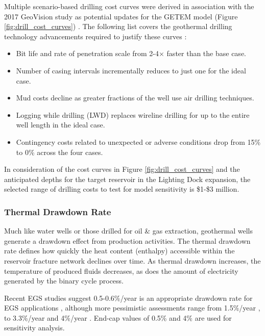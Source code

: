 Multiple scenario-based drilling cost curves were derived in association with the 2017 GeoVision study as potential updates for the GETEM model (Figure \ref{fig:drill_cost_curves}) \citep{lowry_implications_2017}. The following list covers the geothermal drilling technology advancements required to justify these curves \citep{augustine_geovision_2019}:
\begin{itemize}[itemsep=2pt]
    \item Bit life and rate of penetration scale from 2-4$\times$ faster than the base case.
    \item Number of casing intervals incrementally reduces to just one for the ideal case.
    \item Mud costs decline as greater fractions of the well use air drilling techniques.
    \item Logging while drilling (LWD) replaces wireline drilling for up to the entire well length in the ideal case.
    \item Contingency costs related to unexpected or adverse conditions drop from 15\% to 0\% across the four cases.
\end{itemize}
In consideration of the cost curves in Figure \ref{fig:drill_cost_curves} and the anticipated depths for the target reservoir in the Lighting Dock expansion, the selected range of drilling costs to test for model sensitivity is \$1-\$3 million.

\subsubsection{Thermal Drawdown Rate}\label{ch4:drawdown_uncertainty}
Much like water wells or those drilled for oil \& gas extraction, geothermal wells generate a drawdown effect from production activities. The thermal drawdown rate defines how quickly the heat content (enthalpy) accessible within the reservoir fracture network declines over time. As thermal drawdown increases, the temperature of produced fluids decreases, as does the amount of electricity generated by the binary cycle process.

Recent EGS studies suggest 0.5-0.6\%/year is an appropriate drawdown rate for EGS applications \citep{augustine_geovision_2019}, although more pessimistic assessments range from 1.5\%/year \citep{beckers_low-temperature_2016}, to 3.3\%/year \citep{augustine_comparison_2006} and 4\%/year \citep{tester_economic_1990}. End-cap values of 0.5\% and 4\% are used for sensitivity analysis.

